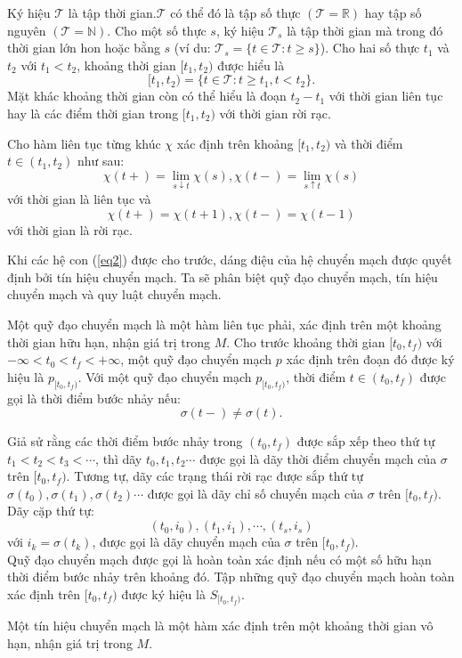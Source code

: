 \documentclass[14pt,a4paper,oneside]{report}		%
\begin{document}
Ký hiệu $\mathcal{T}$ là tập thời gian.$\mathcal{T}$ có thể đó là tập số thực $(\mathcal{T} = \mathbb{R})$ hay tập số nguyên $(\mathcal{T} = \mathbb{N})$. Cho một số thực $s$, ký hiệu $\mathcal{T}_s$ là tập thời gian mà trong đó thời gian lớn hon hoặc bằng $s$ (ví du: $\mathcal{T}_s=\{t\in\mathcal{T} : t\geq s\}$). Cho hai số thực $t_1$ và $t_2$ với $t_1 < t_2$, khoảng thời gian $[t_1, t_2)$ được hiểu là
$$[t_1, t_2)=\{t\in\mathcal{T}: t\geq t_1, t<t_2\}.$$
Mặt khác khoảng thời gian còn có thể hiểu là đoạn $t_2 - t_1$ với thời gian liên tục hay là các điểm thời gian trong $[t_1,t_2)$ với thời gian rời rạc. 

Cho hàm liên tục từng khúc $\chi$ xác định trên khoảng $[t_1,t_2)$ và thời điểm $t \in (t_1,t_2)$ như sau:
$$\chi(t+)=\lim_{s\downarrow t}\chi(s), \chi(t-)=\lim_{s\uparrow t}\chi(s)$$
với thời gian là liên tục và
$$\chi(t+)=\chi(t+1), \chi(t-)=\chi(t-1)$$
với thời gian là rời rạc.

Khi các hệ con (\ref{eq2}) được cho trước, dáng điệu của hệ chuyển mạch được quyết định bởi tín hiệu chuyển mạch. Ta sẽ phân biệt quỹ đạo chuyển mạch, tín hiệu chuyển mạch và quy luật chuyển mạch.

Một quỹ đạo chuyển mạch là một hàm liên tục phải, xác định trên một khoảng thời gian hữu hạn, nhận giá trị trong $M$.
Cho trước khoảng thời gian $[t_0,t_f)$ với $-\infty < t_0 < t_f < +\infty$, một quỹ đạo chuyển mạch $p$ xác định trên đoạn đó được ký hiệu là $p_{[t_0,t_f)}$. Với một quỹ đạo chuyển mạch $p_{[t_0,t_f)}$, thời điểm $t\in (t_0,t_f)$ được gọi là thời điểm bước nhảy nếu:
$$\sigma(t-)\neq\sigma(t).$$

Giả sử rằng các thời điểm bước nhảy trong $(t_0, t_f)$ được sắp xếp theo thứ tự $t_1 < t_2 < t_3 < \cdots$, thì dãy $t_0,t_1,t_2\cdots$ được gọi là dãy thời điểm chuyển mạch của $\sigma$ trên $[t_0,t_f)$. Tương tự, dãy các trạng thái rời rạc được sắp thứ tự $\sigma(t_0),\sigma(t_1),\sigma(t_2)\cdots$ được gọi là dãy chỉ số chuyển mạch của $\sigma$ trên $[t_0,t_f)$. Dãy cặp thứ tự:
$$(t_0,i_0),(t_1,i_1),\cdots,(t_s,i_s)$$
với $i_k=\sigma(t_k)$, được gọi là dãy chuyển mạch của $\sigma$ trên $[t_0,t_f)$.\\
Quỹ đạo chuyển mạch được gọi là hoàn toàn xác định nếu có một số hữu hạn thời điểm bước nhảy trên khoảng đó. Tập những quỹ đạo chuyển mạch hoàn toàn xác định trên $[t_0,t_f)$ được ký hiệu là $S_{[t_0,t_f)}$.

Một tín hiệu chuyển mạch là một hàm xác định trên một khoảng thời gian vô hạn, nhận giá trị trong $M$.
\end{document}
